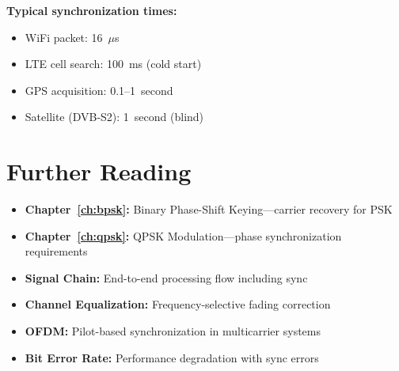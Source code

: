 \textbf{Typical synchronization times:}
\begin{itemize}
\item WiFi packet: 16~$\mu$s
\item LTE cell search: 100~ms (cold start)
\item GPS acquisition: 0.1--1~second
\item Satellite (DVB-S2): 1~second (blind)
\end{itemize}

\section{Further Reading}

\begin{itemize}
\item \textbf{Chapter~\ref{ch:bpsk}:} Binary Phase-Shift Keying---carrier recovery for PSK
\item \textbf{Chapter~\ref{ch:qpsk}:} QPSK Modulation---phase synchronization requirements
\item \textbf{Signal Chain:} End-to-end processing flow including sync
\item \textbf{Channel Equalization:} Frequency-selective fading correction
\item \textbf{OFDM:} Pilot-based synchronization in multicarrier systems
\item \textbf{Bit Error Rate:} Performance degradation with sync errors
\end{itemize}
